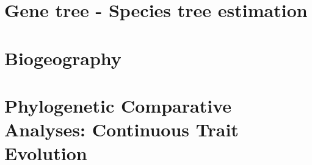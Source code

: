 \documentclass[11pt]{book}
\begin{document}
\newrefsection
\chapter{Gene tree - Species tree estimation}



\newrefsection
\chapter{Biogeography}



\newrefsection
\chapter{Phylogenetic Comparative Analyses: Continuous Trait Evolution}



\end{document}
